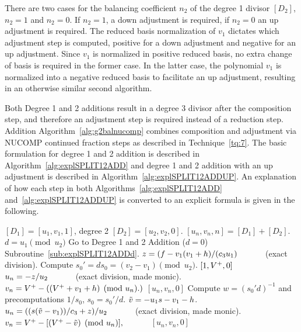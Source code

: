 There are two cases for the balancing coefficient $n_2$ of the degree 1 divisor
$[D_2]$, $n_2=1$ and $n_2 = 0$. If $n_2=1$, a down adjustment is required, if
$n_2=0$ an up adjustment is required. The reduced basis normalization of $v_1$
dictates which adjustment step is computed, positive for a down adjustment and
negative for an up adjustment. Since $v_1$ is normalized in positive reduced
basis, no extra change of basis is required in the former case. In the latter
case, the polynomial $v_1$ is normalized into a negative reduced basis to
facilitate an up adjustment, resulting in an otherwise similar second algorithm.

Both Degree 1 and 2 additions result in a degree 3 divisor after the composition
step, and therefore an adjustment step is required instead of a reduction step.
Addition Algorithm~\ref{alg:g2balnucomp} combines composition and adjustment via
NUCOMP continued fraction steps as described in Technique~\ref{tq:7}. The basic
formulation for degree 1 and 2 addition is described in
Algorithm~\ref{alg:explSPLIT12ADD} and degree 1 and 2 addition with an up
adjustment is described in Algorithm~\ref{alg:explSPLIT12ADDUP}. An explanation
of how each step in both Algorithms~\ref{alg:explSPLIT12ADD}
and~\ref{alg:explSPLIT12ADDUP} is converted to an explicit formula is given in
the following.

\begin{algorithm}[htbp]
\caption{Genus 2 Split Model Degree 1 and 2 Addition\label{alg:explSPLIT12ADD}}
\begin{algorithmic} [1]
\Require $[D_1] = [u_1,v_1,1]$, degree 2 $[D_2] = [u_2,v_2,0]$.\smallskip
\Ensure $[u_n,v_n,n] = [D_1] + [D_2] $.
\algrule
\State $d = u_1 \pmod{u_2}$
    \State Go to Degree 1 and 2 Addition ($d = 0$) Subroutine~\ref{sub:explSPLIT12ADDd}.
\EndIf
\State $z = (f - v_1(v_1 + h)/(c_3u_1) \quad\quad\quad$ (exact division).
\State Compute $s_0' = ds_0 = (v_2 - v_1) \pmod{u_2}$.
     \Return $[1,V^{+},0]$
    \EndIf
\Else 
    \State $u_n = -z/u_2 \quad\quad\quad$ (exact division, made monic).
    \State $v_n = V^{+} - ((V^{+} + v_1 + h)  \pmod{u_n}.)$
    \State \Return $[u_n,v_n,0]$
\EndIf
\State Compute $w = (s_0'd)^{-1}$ and precomputations $1/s_0$, $s_0 = s_0'/d$.
\State $\tilde{v} = -u_1s - v_1 - h$.
\State $u_n = ((s(\tilde{v} - v_1))/c_3 + z)/u_2 \quad\quad\quad$ (exact division, made monic).
\State $v_n = V^{+} - [(V^{+} - \tilde{v}) \pmod{u_n}], \quad\quad\quad$
\State \Return $[u_n,v_n,0]$
\end{algorithmic}
\end{algorithm}

